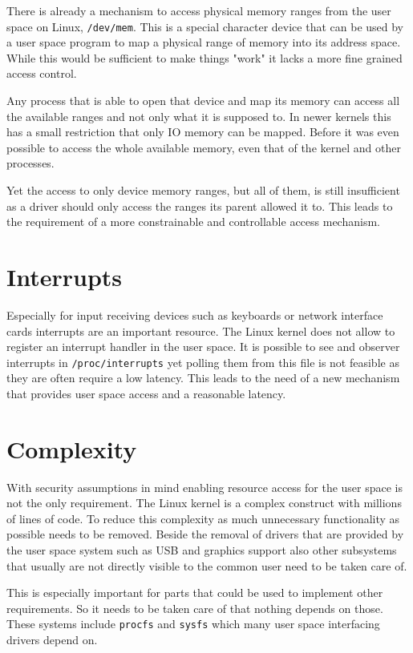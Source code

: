 \documentclass[
a4paper,
12pt,
notitlepage,
parskip=half,
DIV=11,
]{scrbook}
\begin{document}
		There is already a mechanism to access physical memory ranges from the user space on Linux, \texttt{/dev/mem}.
		This is a special character device that can be used by a user space program to map a physical range of memory into its address space.
		While this would be sufficient to make things "work" it lacks a more fine grained access control.
		
		Any process that is able to open that device and map its memory can access all the available ranges and not only what it is supposed to.
		In newer kernels this has a small restriction that only IO memory can be mapped.
		Before it was even possible to access the whole available memory, even that of the kernel and other processes. \citep{devmem}
		
		Yet the access to only device memory ranges, but all of them, is still insufficient as a driver should only access the ranges its parent allowed it to.
		This leads to the requirement of a more constrainable and controllable access mechanism.
	
		\section{Interrupts}
		
		Especially for input receiving devices such as keyboards or network interface cards interrupts are an important resource.
		The Linux kernel does not allow to register an interrupt handler in the user space.
		It is possible to see and observer interrupts in \texttt{/proc/interrupts} yet polling them from this file is not feasible as they are often require a low latency.
		This leads to the need of a new mechanism that provides user space access and a reasonable latency.
	
		\section{Complexity}
		
		With security assumptions in mind enabling resource access for the user space is not the only requirement.
		The Linux kernel is a complex construct with millions of lines of code.
		To reduce this complexity as much unnecessary functionality as possible needs to be removed.
		Beside the removal of drivers that are provided by the user space system such as USB and graphics support also other subsystems that usually are not directly visible to the common user need to be taken care of.
		
		This is especially important for parts that could be used to implement other requirements.
		So it needs to be taken care of that nothing depends on those.
		These systems include \texttt{procfs} and \texttt{sysfs} which many user space interfacing drivers depend on. \citep{sysfs} \citep{procfs}
		
\end{document}
